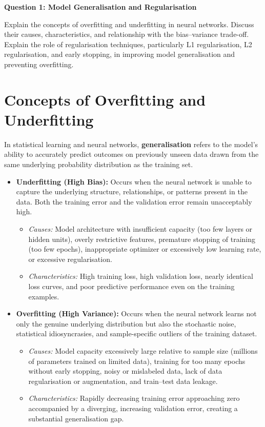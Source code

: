 \documentclass[12pt,a4paper]{article}
\begin{document}
{\noindent\LARGE\textbf{Question 1: Model Generalisation and Regularisation}}\par
\vspace{0.8em}
\noindent Explain the concepts of overfitting and underfitting in neural networks. Discuss their causes, characteristics, and relationship with the bias--variance trade-off. Explain the role of regularisation techniques, particularly L1 regularisation, L2 regularisation, and early stopping, in improving model generalisation and preventing overfitting.
\par\vspace{1.2em}

\section{Concepts of Overfitting and Underfitting}
In statistical learning and neural networks, \textbf{generalisation} refers to the model's ability to accurately predict outcomes on previously unseen data drawn from the same underlying probability distribution as the training set. 

\begin{itemize}[leftmargin=*]
\item \textbf{Underfitting (High Bias):} Occurs when the neural network is unable to capture the underlying structure, relationships, or patterns present in the data. Both the training error and the validation error remain unacceptably high. 
\begin{itemize}
    \item \textit{Causes:} Model architecture with insufficient capacity (too few layers or hidden units), overly restrictive features, premature stopping of training (too few epochs), inappropriate optimizer or excessively low learning rate, or excessive regularisation.
    \item \textit{Characteristics:} High training loss, high validation loss, nearly identical loss curves, and poor predictive performance even on the training examples.
\end{itemize}
\item \textbf{Overfitting (High Variance):} Occurs when the neural network learns not only the genuine underlying distribution but also the stochastic noise, statistical idiosyncrasies, and sample-specific outliers of the training dataset.
\begin{itemize}
    \item \textit{Causes:} Model capacity excessively large relative to sample size (millions of parameters trained on limited data), training for too many epochs without early stopping, noisy or mislabeled data, lack of data regularisation or augmentation, and train--test data leakage.
    \item \textit{Characteristics:} Rapidly decreasing training error approaching zero accompanied by a diverging, increasing validation error, creating a substantial generalisation gap.
\end{itemize}
\end{itemize}
\end{document}
